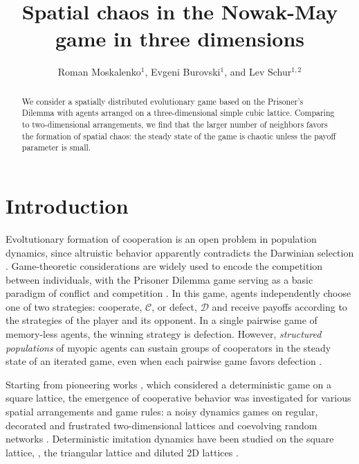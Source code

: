 \documentclass[a4paper]{jpconf}
\begin{document}
\title{Spatial chaos in the Nowak-May game in three dimensions}
%
\author{Roman Moskalenko$^{1}$, Evgeni Burovski$^{1}$, and Lev Schur$^{1, 2}$}
%
\address{$^1$ National Research University Higher School of Economics, 101000 Moscow, Russia}
\address{$^2$ Landau Institute for Theoretical Physics, 142432 Chernogolovka, Russia}


\begin{abstract}
We consider a spatially distributed evolutionary game based on the Prisoner's Dilemma 
with agents arranged on a three-dimensional simple cubic lattice. 
Comparing to two-dimensional arrangements, we find that the larger number of
neighbors favors the formation of spatial chaos: the steady state of the game 
is chaotic unless the payoff parameter is small.
\end{abstract}

\section{Introduction}

Evoltutionary formation of cooperation is an open problem
in population dynamics, since altruistic behavior apparently contradicts the
Darwinian selection \cite{Axelrod2006}.
Game-theoretic considerations are widely used to encode the competition between
individuals, with the Prisoner Dilemma game serving as a basic paradigm of
conflict and competition \cite{Smith1982}.
In this game, agents independently choose one of two strategies: 
cooperate, $\mathcal{C}$, or defect, $\mathcal{D}$ and receive payoffs according
to the strategies of the player and its opponent. In a single pairwise game of
memory-less agents, the winning strategy is defection. However,
\emph{structured populations} of myopic agents can sustain groups of
cooperators in the steady state of an iterated game, even when each pairwise
game favors defection \cite{Nowak1992}.

Starting from pioneering works \cite{Nowak1992, Nowak1993}, which considered
a deterministic game on a square lattice, the emergence of cooperative behavior
was investigated for various spatial arrangements and game rules: a noisy
dynamics games on regular, decorated and frustrated two-dimensional lattices
\cite{Szolnoki2005, Hauert2005, Szolnoki2017} and coevolving random networks
\cite{Szolnoki2009}. Deterministic imitation dynamics have been studied
on the square lattice, \cite{Kolotev2018}, the triangular lattice
\cite{Burovski2019} and diluted 2D lattices \cite{Arenzon2001}.
\end{document}
